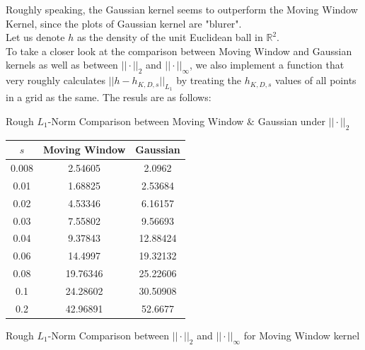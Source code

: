 \documentclass{article}
\begin{document}
Roughly speaking, the Gaussian kernel seems to outperform the Moving Window Kernel, since the plots of Gaussian kernel are "blurer". \vspace*{0.8em}\\
Let us denote $h$ as the density of the unit Euclidean ball in $\mathbb{R}^2$. \\
To take a closer look at the comparison between Moving Window and Gaussian kernels as well as between $||\cdot ||_2$ and $||\cdot ||_{\infty}$, we also implement a function that very roughly calculates $||h-h_{K,D,s}||_{L_1}$ by treating the $h_{K,D,s}$ values of all points in a grid as the same. The resuls are as follows: \vspace*{-0.6cm}\\

\begin{multicols}{2}
\begin{center}
Rough $L_1$-Norm Comparison  between Moving Window $\&$ Gaussian under $||\cdot||_2$ \vspace*{1em} \\
\begin{tabular}{ccc}

\hline  

$s$  &Moving Window              &Gaussian   \\
\hline  

0.008	    &2.54605   &2.0962 \\
0.01	    &1.68825   &2.53684 \\
0.02	    &4.53346   &6.16157 \\
0.03	    &7.55802   &9.56693 \\
0.04	    &9.37843   &12.88424 \\
0.06	    &14.4997   &19.32132 \\
0.08	    &19.76346   &25.22606 \\
0.1	    &24.28602   &30.50908 \\
0.2	    &42.96891   &52.6677 \\

\hline 
\end{tabular}

\end{center}

\begin{center}

Rough $L_1$-Norm Comparison  between $||\cdot ||_2$ and  $||\cdot ||_{\infty}$ for Moving Window kernel \vspace*{1em} \\
\begin{tabular}{ccc}


\end{tabular}
\end{center}
\end{multicols}
\end{document}
